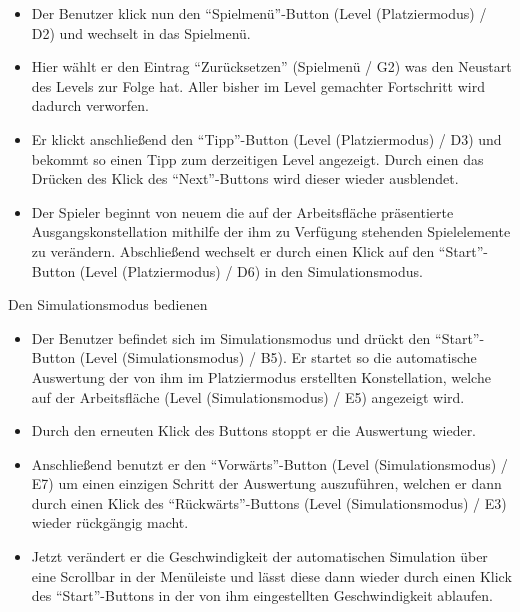 \begin{requirements}
\begin{itemize}
  			\item Der Benutzer klick nun den "`Spielmenü"'-Button (Level (Platziermodus) / D2) und wechselt in das Spielmenü.
  			
  			\item Hier wählt er den Eintrag "`Zurücksetzen"' (Spielmenü / G2) was den Neustart des Levels zur Folge hat. Aller bisher im Level gemachter Fortschritt wird dadurch verworfen.
  			
  			\item Er klickt anschließend den "`Tipp"'-Button (Level (Platziermodus) / D3) und bekommt so einen Tipp zum derzeitigen Level angezeigt. Durch einen das Drücken des Klick des "`Next"'-Buttons wird dieser wieder ausblendet.
  			
  			\item Der Spieler beginnt von neuem die auf der Arbeitsfläche präsentierte Ausgangskonstellation mithilfe der ihm zu Verfügung stehenden Spielelemente zu verändern. Abschließend wechselt er durch einen Klick auf den "`Start"'-Button (Level (Platziermodus) / D6) in den Simulationsmodus.
  	\end{itemize}
  	
  	
  	
  	 Den Simulationsmodus bedienen
  	
	
	\begin{itemize}
	
  			\item Der Benutzer befindet sich im Simulationsmodus und drückt den "`Start"'-Button (Level (Simulationsmodus) / B5). Er startet so die automatische Auswertung der von ihm im Platziermodus erstellten Konstellation, welche auf der Arbeitsfläche (Level (Simulationsmodus) / E5) angezeigt wird.
  			
  			\item Durch den erneuten Klick des Buttons stoppt er die Auswertung wieder.
  			
  			\item Anschließend benutzt er den "`Vorwärts"'-Button (Level (Simulationsmodus) / E7) um einen einzigen Schritt der Auswertung auszuführen, welchen er dann durch einen Klick des "`Rückwärts"'-Buttons (Level (Simulationsmodus) / E3) wieder rückgängig macht.
  			
  			\item Jetzt verändert er die Geschwindigkeit der automatischen Simulation über eine Scrollbar in der Menüleiste und lässt diese dann wieder durch einen Klick des "`Start"'-Buttons in der von ihm eingestellten Geschwindigkeit ablaufen. 
  			

\end{itemize}
\end{requirements}
